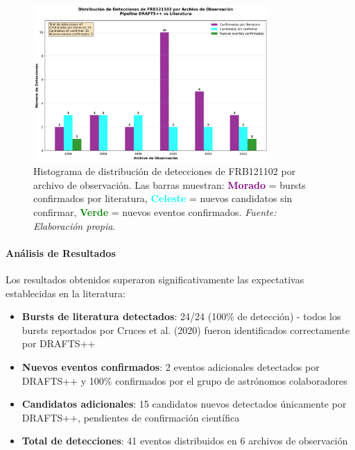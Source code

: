 \begin{figure}[H]
    \centering
    \includegraphics[width=0.8\textwidth]{figures/frb121102_detection_histogram.png}
    \caption[Histograma de detecciones FRB121102]{Histograma de distribución de detecciones de FRB121102 por archivo de observación. Las barras muestran: \textcolor{purple}{\textbf{Morado}} = bursts confirmados por literatura, \textcolor{cyan}{\textbf{Celeste}} = nuevos candidatos sin confirmar, \textcolor{green}{\textbf{Verde}} = nuevos eventos confirmados. \textit{Fuente: Elaboración propia}.}
    \label{fig:frb121102_histogram}
\end{figure}

\paragraph{Análisis de Resultados}

Los resultados obtenidos superaron significativamente las expectativas establecidas en la literatura:

\begin{itemize}
    \item \textbf{Bursts de literatura detectados}: 24/24 (100\% de detección) - todos los bursts reportados por Cruces et al. (2020) fueron identificados correctamente por DRAFTS++
    \item \textbf{Nuevos eventos confirmados}: 2 eventos adicionales detectados por DRAFTS++ y 100\% confirmados por el grupo de astrónomos colaboradores
    \item \textbf{Candidatos adicionales}: 15 candidatos nuevos detectados únicamente por DRAFTS++, pendientes de confirmación científica
    \item \textbf{Total de detecciones}: 41 eventos distribuidos en 6 archivos de observación
\end{itemize}

